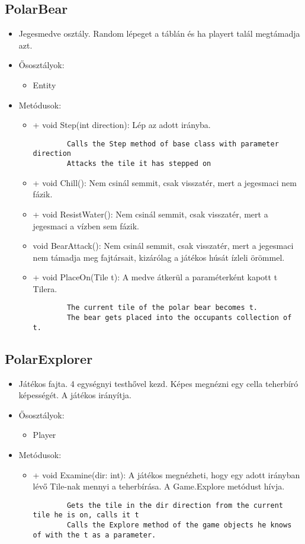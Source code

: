 \subsection{PolarBear}
\begin{itemize}
	\item Jegesmedve osztály. Random lépeget a táblán és ha playert talál megtámadja azt.
	\item Ősosztályok:
	\begin{itemize}
		\item Entity
	\end{itemize}
	\item Metódusok:
	\begin{itemize}
		\item + void Step(int direction): Lép az adott irányba.
		\begin{lstlisting}
		Calls the Step method of base class with parameter direction
		Attacks the tile it has stepped on
		\end{lstlisting}
		\item + void Chill(): Nem csinál semmit, csak visszatér, mert a jegesmaci nem fázik.
		\item + void ResistWater(): Nem csinál semmit, csak visszatér, mert a jegesmaci a vízben sem fázik.
		\item void BearAttack(): Nem csinál semmit, csak visszatér, mert a jegesmaci nem támadja meg fajtársait, kizárólag a játékos húsát ízleli örömmel.
		\item + void PlaceOn(Tile t): A medve átkerül a paraméterként kapott t Tilera.
		\begin{lstlisting}
		The current tile of the polar bear becomes t.
		The bear gets placed into the occupants collection of t.
		\end{lstlisting}
	\end{itemize}
\end{itemize}

\subsection{PolarExplorer}
\begin{itemize}
	\item Játékos fajta. 4 egységnyi testhővel kezd. Képes megnézni egy cella teherbíró képességét. A játékos irányítja.
	\item Ősosztályok:
	\begin{itemize}
		\item Player
	\end{itemize}
	\item Metódusok:
	\begin{itemize}
		\item + void Examine(dir: int): A játékos megnézheti, hogy egy adott irányban lévő Tile-nak mennyi a teherbírása. A Game.Explore metódust hívja.
		\begin{lstlisting}
		Gets the tile in the dir direction from the current tile he is on, calls it t
		Calls the Explore method of the game objects he knows of with the t as a parameter.
		\end{lstlisting}
	\end{itemize}
\end{itemize}

